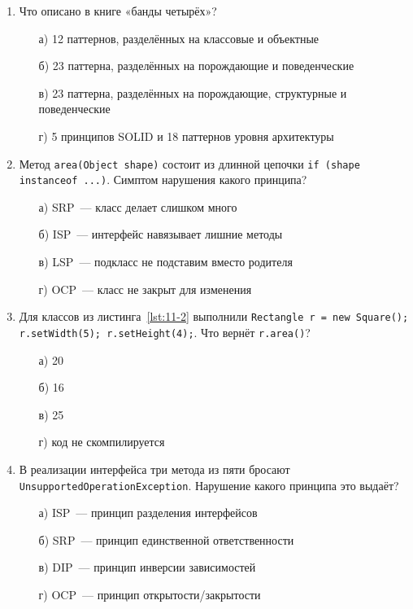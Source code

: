\begin{enumerate}

\item Что описано в книге «банды четырёх»?
  \begin{enumerate}
    \item[а)] 12 паттернов, разделённых на классовые и объектные
    \item[б)] 23 паттерна, разделённых на порождающие и поведенческие
    \item[в)] 23 паттерна, разделённых на порождающие, структурные и
              поведенческие
    \item[г)] 5 принципов SOLID и 18 паттернов уровня архитектуры
  \end{enumerate}

\item Метод \texttt{area(Object shape)} состоит из длинной цепочки
      \texttt{if (shape instanceof ...)}. Симптом нарушения какого принципа?
  \begin{enumerate}
    \item[а)] SRP~--- класс делает слишком много
    \item[б)] ISP~--- интерфейс навязывает лишние методы
    \item[в)] LSP~--- подкласс не подставим вместо родителя
    \item[г)] OCP~--- класс не закрыт для изменения
  \end{enumerate}

\item Для классов из листинга~\ref{lst:11-2} выполнили
      \texttt{Rectangle r = new Square(); r.setWidth(5); r.setHeight(4);}.
      Что вернёт \texttt{r.area()}?
  \begin{enumerate}
    \item[а)] 20
    \item[б)] 16
    \item[в)] 25
    \item[г)] код не скомпилируется
  \end{enumerate}

\item В реализации интерфейса три метода из пяти бросают
      \texttt{UnsupportedOperationException}. Нарушение какого принципа это
      выдаёт?
  \begin{enumerate}
    \item[а)] ISP~--- принцип разделения интерфейсов
    \item[б)] SRP~--- принцип единственной ответственности
    \item[в)] DIP~--- принцип инверсии зависимостей
    \item[г)] OCP~--- принцип открытости/закрытости
  \end{enumerate}


\end{enumerate}

